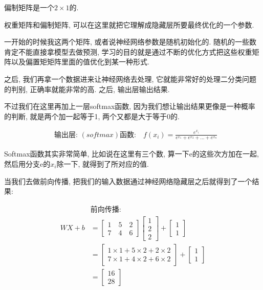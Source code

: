 偏制矩阵是一个$2 \times 1$的. 

权重矩阵和偏制矩阵, 可以在这里就把它理解成隐藏层所要最终优化的一个参数. 

一开始的时候我这两个矩阵, 或者说神经网络参数是随机初始化的. 随机的一些数肯定不能直接拿模型去做预测, 学习的目的就是通过不断的优化方式把这些权重矩阵以及偏置矩矩阵里面的值优化到某一种形式. 

之后, 我们再拿一个数据进来让神经网络去处理, 它就能非常好的处理二分类问题的判别, 正确率就能非常的高. 之后, 输出层输出结果. 

不过我们在这里再加上一层softmax函数, 因为我们想让输出结果更像是一种概率的判断, 就是两个加一起等于1, 两个又都是大于等于0的. 

\begin{align*}
  & \mbox{输出层: }(softmax)\mbox{函数:} \quad f(x_i) = \frac{e^{x_i}}{e^{x_1}+e^{x_2}+...+e^{x_n}}
\end{align*}

Softmax函数其实非常简单, 比如说在这里有三个数, 算一下e的这些次方加在一起, 然后用分支e的$x_i$除一下, 就得到了所对应的值. 

当我们去做前向传播, 把我们的输入数据通过神经网络隐藏层之后就得到了一个结果:

\begin{align*}
  & \mbox{前向传播: }\\
  WX + b & = \begin{bmatrix} 1 \quad 5 \quad 2 \\ 7 \quad 4 \quad 6 \end{bmatrix} \begin{bmatrix} 1 \\ 2 \\ 2 \end{bmatrix} + \begin{bmatrix} 1 \\ 1 \end{bmatrix} \\
  & = \begin{bmatrix} 1 \times 1 + 5 \times 2 + 2 \times 2 \\ 7 \times 1 + 4 \times 2 + 6 \times 2\end{bmatrix} + \begin{bmatrix} 1 \\ 1 \end{bmatrix} \\
  & = \begin{bmatrix} 16 \\ 28 \end{bmatrix}
\end{align*}

